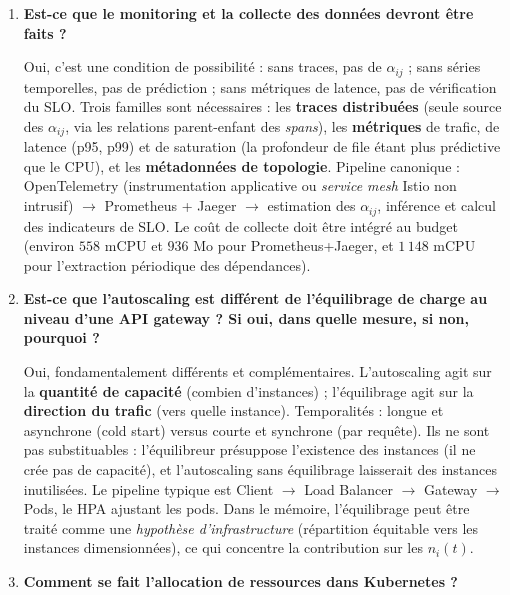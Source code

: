 \documentclass[11pt,a4paper]{article}
\begin{document}
\begin{enumerate}[label=\textbf{Q\arabic*.}, leftmargin=*, itemsep=0.6em]
\item \textbf{Est-ce que le monitoring et la collecte des données devront être faits ?}

Oui, c'est une condition de possibilité : sans traces, pas de \( \alpha_{ij} \) ; sans séries temporelles, pas de prédiction ; sans métriques de latence, pas de vérification du SLO. Trois familles sont nécessaires : les \textbf{traces distribuées} (seule source des \( \alpha_{ij} \), via les relations parent-enfant des \emph{spans}), les \textbf{métriques} de trafic, de latence (p95, p99) et de saturation (la profondeur de file étant plus prédictive que le CPU), et les \textbf{métadonnées de topologie}. Pipeline canonique : OpenTelemetry (instrumentation applicative ou \emph{service mesh} Istio non intrusif) \( \to \) Prometheus + Jaeger \( \to \) estimation des \( \alpha_{ij} \), inférence et calcul des indicateurs de SLO. Le coût de collecte doit être intégré au budget (environ \(558\) mCPU et \(936\) Mo pour Prometheus+Jaeger, et \(1\,148\) mCPU pour l'extraction périodique des dépendances).

\item \textbf{Est-ce que l'autoscaling est différent de l'équilibrage de charge au niveau d'une API gateway ? Si oui, dans quelle mesure, si non, pourquoi ?}

Oui, fondamentalement différents et complémentaires. L'autoscaling agit sur la \textbf{quantité de capacité} (combien d'instances) ; l'équilibrage agit sur la \textbf{direction du trafic} (vers quelle instance). Temporalités : longue et asynchrone (cold start) versus courte et synchrone (par requête). Ils ne sont pas substituables : l'équilibreur présuppose l'existence des instances (il ne crée pas de capacité), et l'autoscaling sans équilibrage laisserait des instances inutilisées. Le pipeline typique est Client \( \to \) Load Balancer \( \to \) Gateway \( \to \) Pods, le HPA ajustant les pods. Dans le mémoire, l'équilibrage peut être traité comme une \emph{hypothèse d'infrastructure} (répartition équitable vers les instances dimensionnées), ce qui concentre la contribution sur les \( n_i(t) \).

\item \textbf{Comment se fait l'allocation de ressources dans Kubernetes ?}


\end{enumerate}
\end{document}
